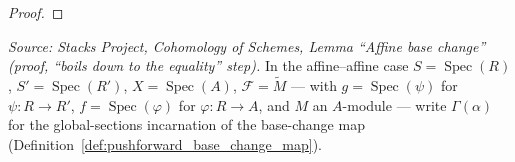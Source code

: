 \begin{proof}
\end{proof}

\begin{lemma}



  \label{lem:pushforward_base_change_mate_cancelBaseChange}
  \textit{Source: Stacks Project, Cohomology of Schemes, Lemma ``Affine base
  change'' (proof, ``boils down to the equality'' step).}
  In the affine--affine case \(S = \operatorname{Spec}(R)\),
  \(S' = \operatorname{Spec}(R')\), \(X = \operatorname{Spec}(A)\),
  \(\mathcal{F} = \widetilde{M}\) — with \(g = \operatorname{Spec}(\psi)\) for
  \(\psi : R \to R'\), \(f = \operatorname{Spec}(\varphi)\) for \(\varphi : R \to A\),
  and \(M\) an \(A\)-module — write \(\Gamma(\alpha)\) for the global-sections
  incarnation of the base-change map (Definition~\ref{def:pushforward_base_change_map}).

\end{lemma}
